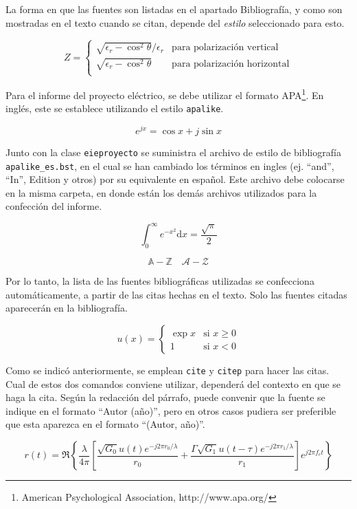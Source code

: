 La forma en que las fuentes son listadas en el apartado Bibliografía, y como son mostradas en el texto cuando se citan, depende del \emph{estilo} seleccionado para esto.

\begin{equation}
Z = \begin{cases}
\sqrt{\epsilon_r - \cos^2 \theta}/\epsilon_r & \text{para polarización vertical} \\
\sqrt{\epsilon_r - \cos^2 \theta} & \text{para polarización horizontal} \\
\end{cases}
\end{equation}

Para el informe del proyecto eléctrico, se debe utilizar el formato APA\footnote{American Psychological Association, http://www.apa.org/}.  En inglés, este se establece utilizando el estilo \texttt{apalike}.  

\begin{equation}
 e^{jx} = \cos{x} + j \sin{x}
\end{equation}

Junto con la clase \texttt{eieproyecto} se suministra el archivo de estilo de bibliografía \texttt{apalike\_es.bst}, en el cual se han cambiado los términos en ingles (ej. ``and'', ``In'', Edition y otros) por su equivalente en español.  Este archivo debe colocarse en la misma carpeta, en donde están los demás archivos utilizados para la confección del informe.

\begin{equation}
\int_0^\infty e^{-x^2} \mathrm{d}x = \frac{\sqrt{\pi}}{2}
\end{equation}

\begin{equation}
\mathbb{A-Z} \quad 
\mathcal{A-Z}
\end{equation}

Por lo tanto, la lista de las fuentes bibliográficas utilizadas se confecciona automáticamente, a partir de las citas hechas en el texto.  Solo las fuentes citadas aparecerán en la bibliografía.

\begin{equation}
u(x) = 
  \begin{cases} 
   \exp{x} & \text{si } x \geq 0 \\
   1       & \text{si } x < 0
  \end{cases}
\end{equation}

Como se indicó anteriormente, se emplean \texttt{cite} y \texttt{citep} para hacer las citas.  Cual de estos dos comandos conviene utilizar, dependerá del contexto en que se haga la cita.  Según la redacción del párrafo, puede convenir que la fuente se indique en el formato ``Autor (año)'', pero en otros casos pudiera ser preferible que esta aparezca en el formato ``(Autor, año)''.

\begin{equation}
r(t) = \Re \left\lbrace \frac{\lambda}{4\pi} \left[ \frac{\sqrt{G_0} u(t) e^{-j2\pi r_0/\lambda}}{r_0} + \frac{\Gamma \sqrt{G_1} u(t-\tau) e^{-j2\pi r_1/\lambda}}{r_1} \right] e^{j2\pi f_c t}  \right\rbrace
\end{equation}